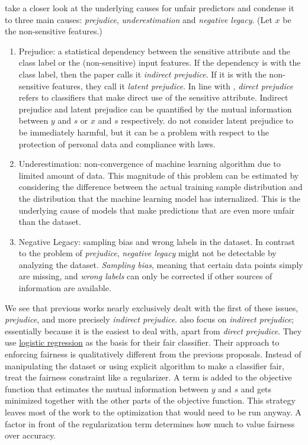 \citet{kamishima2011fairness} take a closer look
at the underlying causes for unfair predictors and condense it to three main causes:
\emph{prejudice}, \emph{underestimation} and \emph{negative legacy}.
(Let \(x\) be the non-sensitive features.)

\begin{enumerate}
\item
  Prejudice:
  a statistical dependency between the sensitive attribute
  and the class label or the (non-sensitive) input features.
  If the dependency is with the class label, then the paper calls it \emph{indirect prejudice}.
  If it is with the non-sensitive features, they call it \emph{latent prejudice}.
  In line with \citet{pedreshi2008discrimination},
  \emph{direct prejudice} refers to classifiers that make direct use of the sensitive attribute.
  Indirect prejudice and latent prejudice can be quantified by
  the mutual information between \(y\) and \(s\) or \(x\) and \(s\) respectively.
  \citet{kamishima2011fairness} do not consider latent prejudice to be immediately harmful,
  but it can be a problem with respect to the protection of personal data and compliance with laws.
\item
  Underestimation:
  non-convergence of machine learning algorithm due to limited amount of data.
  This magnitude of this problem can be estimated
  by considering the difference between the actual training sample distribution
  and the distribution that the machine learning model has internalized.
  This is the underlying cause of models that make predictions
  that are even more unfair than the dataset.
\item
  Negative Legacy:
  sampling bias and wrong labels in the dataset.
  In contrast to the problem of \emph{prejudice},
  \emph{negative legacy} might not be detectable by analyzing the dataset.
  \emph{Sampling bias}, meaning that certain data points simply are missing,
  and \emph{wrong labels} can only be corrected if other sources of information are available.
\end{enumerate}

We see that previous works nearly exclusively dealt with the first of these issues, \emph{prejudice},
and more precisely \emph{indirect prejudice}.
\citet{kamishima2011fairness} also focus on \emph{indirect prejudice};
essentially because it is the easiest to deal with, apart from \emph{direct prejudice}.
They use \href{https://en.wikipedia.org/wiki/Logistic_regression}{logistic regression} as the basis for their fair classifier.
Their approach to enforcing fairness is qualitatively different from the previous proposals.
Instead of manipulating the dataset or using explicit algorithm to make a classifier fair,
\citet{kamishima2011fairness} treat the fairness constraint like a regularizer.
A term is added to the objective function
that estimates the mutual information between \(y\) and \(s\)
and gets minimized together with the other parts of the objective function.
This strategy leaves most of the work to the optimization that would need to be run anyway.
A factor in front of the regularization term determines how much to value fairness over accuracy.

